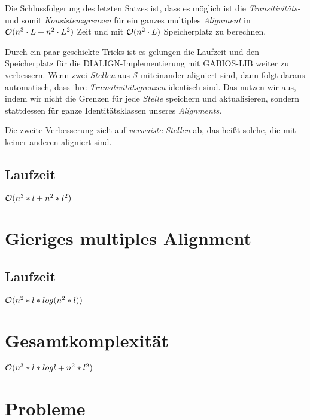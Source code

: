 Die Schlussfolgerung des letzten Satzes ist, dass es möglich ist die \emph{Transitivitäts-} und somit \emph{Konsistenzgrenzen} für ein ganzes multiples \emph{Alignment} in $\mathcal{O}(n^3\cdot L + n^2\cdot L^2)$ Zeit und mit $\mathcal{O}(n^2\cdot L)$ Speicherplatz zu berechnen. 

Durch ein paar geschickte Tricks ist es \cite{am00} gelungen die Laufzeit und den Speicherplatz für die DIALIGN-Implementierung mit GABIOS-LIB weiter zu verbessern. Wenn zwei \emph{Stellen} aus $\mathcal{S}$ miteinander aligniert sind, dann folgt daraus automatisch, dass ihre \emph{Transitivitätsgrenzen} identisch sind. Das nutzen wir aus, indem wir nicht die Grenzen für jede \emph{Stelle} speichern und aktualisieren, sondern stattdessen für ganze Identitätsklassen unseres \emph{Alignments}.

Die zweite Verbesserung zielt auf \emph{verwaiste} \emph{Stellen} ab, das heißt solche, die mit keiner anderen aligniert sind.  

\subsection{Laufzeit}
$\mathcal{O}(n^3*l + n^2*l^2)$

\section{Gieriges multiples Alignment}

\subsection{Laufzeit}
$\mathcal{O}(n^2*l*log(n^2*l))$

\section{Gesamtkomplexität}
$\mathcal{O}(n^3*l*log l + n^2*l^2)$

\section{Probleme}
